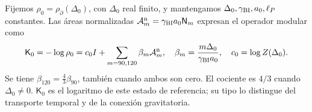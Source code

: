 Fijemos \(\rho_0=\rho_\partial(\Delta_0)\), con
\(\Delta_0\) real finito, y mantengamos
\(\Delta_0,\gamma_{\rm BI},a_0,\ell_P\) constantes. Las áreas
normalizadas \(\mathcal A_m^{\rm n}=\gamma_{\rm BI}a_0\mathsf N_m\)
expresan el operador modular como
\begin{equation}
 \mathsf K_0=-\log\rho_0
 =c_0I+\sum_{m=90,120}\beta_m\mathcal A_m^{\rm n},
 \quad \beta_m=\frac{m\Delta_0}{\gamma_{\rm BI}a_0},
 \quad c_0=\log Z(\Delta_0).
 \label{vii:vii:eq:operador-modular-areal}
\end{equation}
Se tiene \(\beta_{120}=\tfrac43\beta_{90}\), también cuando ambos
son cero. El cociente es \(4/3\) cuando \(\Delta_0\ne0\).
\(\mathsf K_0\) es el logaritmo de este estado de referencia; su tipo
lo distingue del transporte temporal y de la conexión gravitatoria.

